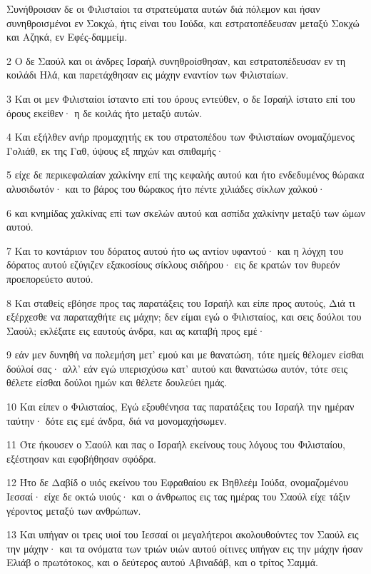 \par Συνήθροισαν δε οι Φιλισταίοι τα στρατεύματα αυτών διά πόλεμον και ήσαν συνηθροισμένοι εν Σοκχώ, ήτις είναι του Ιούδα, και εστρατοπέδευσαν μεταξύ Σοκχώ και Αζηκά, εν Εφές-δαμμείμ.
\par 2 Ο δε Σαούλ και οι άνδρες Ισραήλ συνηθροίσθησαν, και εστρατοπέδευσαν εν τη κοιλάδι Ηλά, και παρετάχθησαν εις μάχην εναντίον των Φιλισταίων.
\par 3 Και οι μεν Φιλισταίοι ίσταντο επί του όρους εντεύθεν, ο δε Ισραήλ ίστατο επί του όρους εκείθεν· η δε κοιλάς ήτο μεταξύ αυτών.
\par 4 Και εξήλθεν ανήρ προμαχητής εκ του στρατοπέδου των Φιλισταίων ονομαζόμενος Γολιάθ, εκ της Γαθ, ύψους εξ πηχών και σπιθαμής·
\par 5 είχε δε περικεφαλαίαν χαλκίνην επί της κεφαλής αυτού και ήτο ενδεδυμένος θώρακα αλυσιδωτόν· και το βάρος του θώρακος ήτο πέντε χιλιάδες σίκλων χαλκού·
\par 6 και κνημίδας χαλκίνας επί των σκελών αυτού και ασπίδα χαλκίνην μεταξύ των ώμων αυτού.
\par 7 Και το κοντάριον του δόρατος αυτού ήτο ως αντίον υφαντού· και η λόγχη του δόρατος αυτού εζύγιζεν εξακοσίους σίκλους σιδήρου· εις δε κρατών τον θυρεόν προεπορεύετο αυτού.
\par 8 Και σταθείς εβόησε προς τας παρατάξεις του Ισραήλ και είπε προς αυτούς, Διά τι εξέρχεσθε να παραταχθήτε εις μάχην; δεν είμαι εγώ ο Φιλισταίος, και σεις δούλοι του Σαούλ; εκλέξατε εις εαυτούς άνδρα, και ας καταβή προς εμέ·
\par 9 εάν μεν δυνηθή να πολεμήση μετ' εμού και με θανατώση, τότε ημείς θέλομεν είσθαι δούλοί σας· αλλ' εάν εγώ υπερισχύσω κατ' αυτού και θανατώσω αυτόν, τότε σεις θέλετε είσθαι δούλοι ημών και θέλετε δουλεύει ημάς.
\par 10 Και είπεν ο Φιλισταίος, Εγώ εξουθένησα τας παρατάξεις του Ισραήλ την ημέραν ταύτην· δότε εις εμέ άνδρα, διά να μονομαχήσωμεν.
\par 11 Ότε ήκουσεν ο Σαούλ και πας ο Ισραήλ εκείνους τους λόγους του Φιλισταίου, εξέστησαν και εφοβήθησαν σφόδρα.
\par 12 Ήτο δε Δαβίδ ο υιός εκείνου του Εφραθαίου εκ Βηθλεέμ Ιούδα, ονομαζομένου Ιεσσαί· είχε δε οκτώ υιούς· και ο άνθρωπος εις τας ημέρας του Σαούλ είχε τάξιν γέροντος μεταξύ των ανθρώπων.
\par 13 Και υπήγαν οι τρεις υιοί του Ιεσσαί οι μεγαλήτεροι ακολουθούντες τον Σαούλ εις την μάχην· και τα ονόματα των τριών υιών αυτού οίτινες υπήγαν εις την μάχην ήσαν Ελιάβ ο πρωτότοκος, και ο δεύτερος αυτού Αβιναδάβ, και ο τρίτος Σαμμά.
